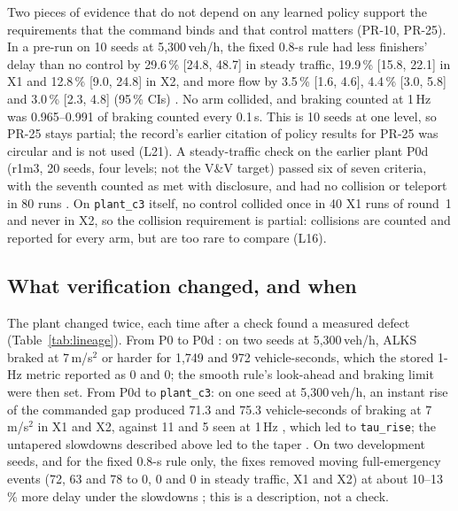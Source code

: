 Two pieces of evidence that do not depend on any learned policy support the requirements that the command binds and that control matters (PR-10, PR-25).
In a pre-run on 10 seeds at 5,300\,veh/h, the fixed 0.8-s rule had less finishers' delay than no control by 29.6\,\% [24.8, 48.7] in steady traffic, 19.9\,\% [15.8, 22.1] in X1 and 12.8\,\% [9.0, 24.8] in X2, and more flow by 3.5\,\% [1.6, 4.6], 4.4\,\% [3.0, 5.8] and 3.0\,\% [2.3, 4.8] (95\,\% CIs) .
No arm collided, and braking counted at 1\,Hz was 0.965--0.991 of braking counted every 0.1\,s.
This is 10 seeds at one level, so PR-25 stays partial; the record's earlier citation of policy results for PR-25 was circular and is not used (L21).
A steady-traffic check on the earlier plant P0d (r1m3, 20 seeds, four levels; not the V\&V target) passed six of seven criteria, with the seventh counted as met with disclosure, and had no collision or teleport in 80 runs .
On \texttt{plant\_c3} itself, no control collided once in 40 X1 runs of round~1 and never in X2, so the collision requirement is partial: collisions are counted and reported for every arm, but are too rare to compare (L16).

\begin{table}[tbp]
\centering
{}
\caption{V\&V summary for r2m3 \texttt{plant\_c3}.}\label{tab:vv}
\end{table}

\subsection{What verification changed, and when}\label{sec:verification_changed}

The plant changed twice, each time after a check found a measured defect (Table~\ref{tab:lineage}).
From P0 to P0d : on two seeds at 5,300\,veh/h, ALKS braked at 7\,m/s$^2$ or harder for 1,749 and 972 vehicle-seconds, which the stored 1-Hz metric reported as 0 and 0; the smooth rule's look-ahead and braking limit were then set.
From P0d to \texttt{plant\_c3}: on one seed at 5,300\,veh/h, an instant rise of the commanded gap produced 71.3 and 75.3 vehicle-seconds of braking at 7\,m/s$^2$ in X1 and X2, against 11 and 5 seen at 1\,Hz , which led to \texttt{tau\_rise}; the untapered slowdowns described above led to the taper .
On two development seeds, and for the fixed 0.8-s rule only, the fixes removed moving full-emergency events (72, 63 and 78 to 0, 0 and 0 in steady traffic, X1 and X2) at about 10--13\,\% more delay under the slowdowns ; this is a description, not a check.

